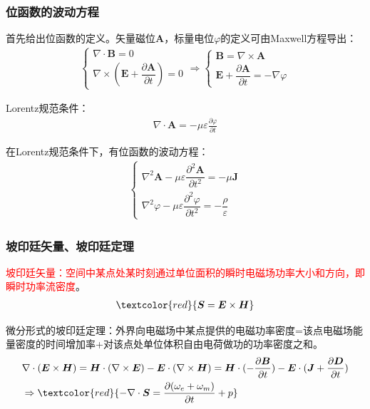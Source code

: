 \documentclass[withoutpreface,bwprint]{cumcmthesis} %
\begin{document}
\subsubsection{位函数的波动方程}
首先给出位函数的定义。矢量磁位$\boldsymbol{A}$，标量电位$\varphi$的定义可由Maxwell方程导出：
\begin{align}
    \begin{cases}
        \nabla \cdot \boldsymbol{B} = 0\\
        \nabla \times (\boldsymbol{E} + \dfrac{\partial \boldsymbol{A}}{\partial t}) = 0
    \end{cases}
    \Rightarrow
    \begin{cases}
        \boldsymbol{B} = \nabla \times \boldsymbol{A}\\
        \boldsymbol{E} + \dfrac{\partial \boldsymbol{A}}{\partial t} = -\nabla \varphi 
    \end{cases}
\end{align}

Lorentz规范条件：
\begin{align}
    \nabla \cdot \boldsymbol{A} = -\mu\varepsilon \frac{\partial \varphi}{\partial t}
\end{align}

在Lorentz规范条件下，有位函数的波动方程：
\begin{align}
    \begin{cases}
        \nabla^2 \boldsymbol{A} - \mu\varepsilon\dfrac{\partial^2 \boldsymbol{A}}{\partial t^2} = -\mu \boldsymbol{J}\\
        \nabla^2 \varphi - \mu\varepsilon\dfrac{\partial^2 \varphi}{\partial t^2} = -\dfrac{\rho}{\varepsilon}
    \end{cases}
\end{align}

\subsubsection{坡印廷矢量、坡印廷定理}
\textcolor{red}{坡印廷矢量：空间中某点处某时刻通过单位面积的瞬时电磁场功率大小和方向，即瞬时功率流密度}。
\begin{align}
    \textcolor{red}{\boldsymbol{S} = \boldsymbol{E}\times \boldsymbol{H}}
\end{align}

微分形式的坡印廷定理：外界向电磁场中某点提供的电磁功率密度=该点电磁场能量密度的时间增加率+对该点处单位体积自由电荷做功的功率密度之和。
\begin{align}
    &\nabla \cdot (\boldsymbol{E}\times \boldsymbol{H}) 
    = \boldsymbol{H}\cdot (\nabla \times \boldsymbol{E}) - \boldsymbol{E}\cdot (\nabla \times \boldsymbol{H}) 
    = \boldsymbol{H}\cdot (-\frac{\partial \boldsymbol{B}}{\partial t}) - \boldsymbol{E}\cdot (\boldsymbol{J} + \frac{\partial \boldsymbol{D}}{\partial t}) \\
    &\Rightarrow \textcolor{red}{-\nabla \cdot \boldsymbol{S} = \frac{\partial (\omega_e+\omega_m)}{\partial t}+p}
\end{align}
\end{document}
